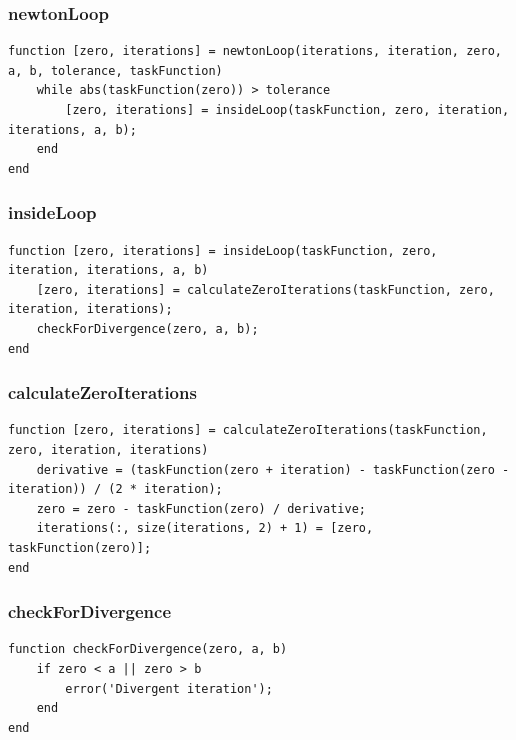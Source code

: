 \subsubsection{newtonLoop}
\begin{simplechar}
\begin{lstlisting}
function [zero, iterations] = newtonLoop(iterations, iteration, zero, a, b, tolerance, taskFunction)
    while abs(taskFunction(zero)) > tolerance
        [zero, iterations] = insideLoop(taskFunction, zero, iteration, iterations, a, b);
    end
end
\end{lstlisting}
\end{simplechar}

\subsubsection{insideLoop}
\begin{simplechar}
\begin{lstlisting}
function [zero, iterations] = insideLoop(taskFunction, zero, iteration, iterations, a, b)
    [zero, iterations] = calculateZeroIterations(taskFunction, zero, iteration, iterations);
    checkForDivergence(zero, a, b);
end
\end{lstlisting}
\end{simplechar}

\subsubsection{calculateZeroIterations}
\begin{simplechar}
\begin{lstlisting}
function [zero, iterations] = calculateZeroIterations(taskFunction, zero, iteration, iterations)
    derivative = (taskFunction(zero + iteration) - taskFunction(zero - iteration)) / (2 * iteration);
    zero = zero - taskFunction(zero) / derivative;
    iterations(:, size(iterations, 2) + 1) = [zero, taskFunction(zero)];
end
\end{lstlisting}
\end{simplechar}

\subsubsection{checkForDivergence}
\begin{simplechar}
\begin{lstlisting}
function checkForDivergence(zero, a, b)
    if zero < a || zero > b
        error('Divergent iteration');
    end
end
\end{lstlisting}
\end{simplechar}

\newpage

